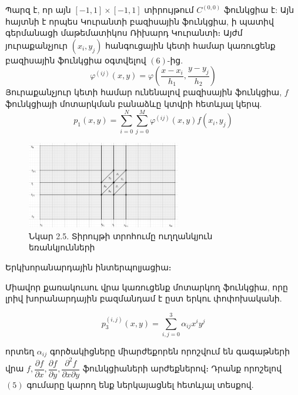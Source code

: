 \documentclass[fleqn, bachelor,subf,12pt,notitlepage]{article}
\begin{document}
Պարզ է, որ այն $\left[-1, 1\right] \times \left[-1	, 1\right]$ տիրույթում $C^{(0, 0)}$ ֆունկցիա է: Այն հայտնի է որպես Կուրանտի բազիսային ֆունկցիա, ի պատիվ գերմանացի մաթեմատիկոս Ռիխարդ Կուրանտի։
Այժմ յուրաքանչյուր $\left(x_{i}, y_{j}\right)$ հանգուցային կետի համար կառուցենք բազիսային ֆունկցիա օգտվելով $\left(6\right)$-ից.
\begin{equation}
\varphi^{(ij)}(x,y)=\varphi \left(\dfrac{x-x_{i}}{h_{1}}, \dfrac{y-y_{j}}{h_{2}}\right)
\end{equation}
Յուրաքանչյուր կետի համար ունենալով բազիսային ֆունկցիա, $f$ ֆունկցիայի մոտարկման բանաձևը կտվրի հետևյալ կերպ.
\begin{equation}
p_{1}(x,y)=\sum_{i=0}^{N}\sum_{j=0}^{M}\varphi^{(ij)}(x,y)f(x_{i}, y_{j})
\end{equation}
\begin{figure}[H]
\centering
\includegraphics[width=0.6\textwidth]{images/two_var_courant_3}
\captionsetup{labelformat=empty}
\caption{Նկար 2.5. Տիրույթի տրոհումը ուղղանկյուն եռանկյունների}
\end{figure}

Երկխորանարդային ինտերպոլյացիա։

Միավոր քառակուսու վրա կառուցենք մոտարկող ֆունկցիա, որը լրիվ խորանարդային բազմանդամ է ըստ երկու փոփոխականի.

\begin{equation}
			p_{3}^{(i, j)}(x, y)=\sum_{i, j=0}^{3}\alpha_{ij}x^{i}y^{j}
\end{equation}

որտեղ $\alpha_{ij}$ գործակիցները միարժեքորեն որոշվում են գագաթների վրա $f, \dfrac{\partial f}{\partial x}, \dfrac{\partial f}{\partial y}, \dfrac{\partial^{2} f}{\partial x \partial y}$ ֆունկցիաների արժեքներով։ Դրանք որոշելով $\left(5\right)$ գումարը կարող ենք ներկայացնել հետևյալ տեսքով.
\end{document}
